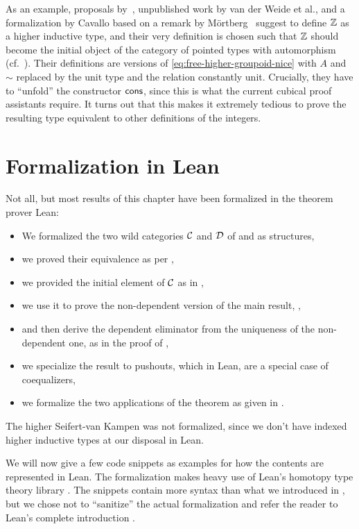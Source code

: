 \begin{remark}
As an example, proposals by~\citet{gun:squid}, unpublished
work by van der Weide et al., and a formalization by Cavallo based on a remark
by M\"ortberg~\citep{Evan:Squid} suggest to define $\mathbb Z$ as a higher inductive
type, and their very definition is chosen such that $\mathbb Z$ should become the
initial object of the category of pointed types with automorphism
(cf.\ ).
Their definitions are versions of \eqref{eq:free-higher-groupoid-nice} with
$A$ and $\sim$ replaced by the unit type and the relation constantly unit.
Crucially, they have to ``unfold'' the constructor $\mathsf{cons}$, since this is
what the current cubical proof assistants require.
It turns out that this makes it extremely tedious to prove the resulting
type equivalent to other definitions of the integers.
\end{remark}

\section{Formalization in Lean}\label{sec:paths-lean}

Not all, but most results of this chapter have been formalized in the
theorem prover Lean:
\begin{itemize}
\item We formalized the two wild categories $\mathcal C$ and $\mathcal D$
of  and  as structures,
\item we proved their equivalence as per ,
\item we provided the initial element of $\mathcal C$ as in ,
\item we use it to prove the non-dependent version of the main result,
,
\item and then derive the dependent eliminator from the uniqueness of
the non-dependent one, as in the proof of ,
\item we specialize the result to pushouts, which in Lean, are a special case of
coequalizers,
\item we formalize the two applications of the theorem as given in
.
\end{itemize}
The higher Seifert-van Kampen was not formalized, since we don't have
indexed higher inductive types at our disposal in Lean.

We will now give a few code snippets as examples for how the contents
are represented in Lean.
The formalization makes heavy use of Lean's homotopy type theory library
\citep{leanhott}.
The snippets contain more syntax than what we introduced in ,
but we chose not to ``sanitize'' the actual formalization and refer the reader
to Lean's complete introduction \citep{avigad2015theorem}.


